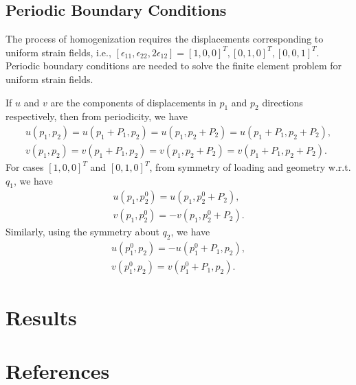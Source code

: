 \documentclass[10pt]{article}
\begin{document}
\subsection{Periodic Boundary Conditions}
The process of homogenization requires the displacements corresponding to uniform strain fields, i.e., $[\epsilon_{11}, \epsilon_{22}, 2\epsilon_{12}] = [1, 0, 0]^T, [0, 1, 0]^T, [0, 0, 1]^T$. Periodic boundary conditions are needed to solve the finite element problem for uniform strain fields.\par
If $u$ and $v$ are the components of displacements in $p_1$ and $p_2$ directions respectively, then from periodicity, we have
\begin{eqnarray}
\label{eq:periodicity1}
u(p_1, p_2) = u(p_1+P_1, p_2) = u(p_1, p_2+P_2) = u(p_1+P_1, p_2+P_2),\\
\label{eq:periodicity2}
v(p_1, p_2) = v(p_1+P_1, p_2) = v(p_1, p_2+P_2) = v(p_1+P_1, p_2+P_2).
\end{eqnarray}
For cases $[1, 0, 0]^T$ and $[0, 1, 0]^T$, from symmetry of loading and geometry w.r.t. $q_1$, we have
\begin{eqnarray}
u(p_1, p_2^0) = u(p_1, p_2^0+P_2),\\
v(p_1, p_2^0) = -v(p_1, p_2^0+P_2).
\end{eqnarray}
Similarly, using the symmetry about $q_2$, we have
\begin{eqnarray}
u(p_1^0, p_2) = -u(p_1^0+P_1, p_2),\\
v(p_1^0, p_2) = v(p_1^0+P_1, p_2).
\end{eqnarray}

\section{Results}
\cite{first}
\cite{WEBSITE:1}


\section{References}


\end{document}
